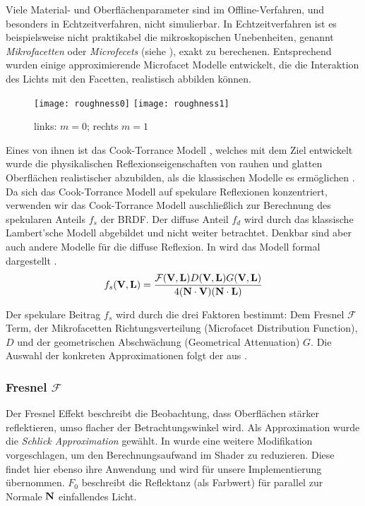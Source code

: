 Viele Material- und Oberflächenparameter sind im Offline-Verfahren, und besonders in Echtzeitverfahren, nicht simulierbar. In Echtzeitverfahren ist es beispielsweise nicht praktikabel die mikroskopischen Unebenheiten, genannt \textit{Mikrofacetten} oder \textit{Microfecets} (siehe ), exakt zu berechenen. Entsprechend wurden einige approximierende Microfacet Modelle entwickelt, die die Interaktion des Lichts mit den Facetten, realistisch abbilden können.

\begin{figure}
	\texttt{[image: roughness0]}
	\texttt{[image: roughness1]}
	\caption[Rauheit]{links: $m = 0$; rechts $m = 1$}\label{fig:microfacet}
\end{figure}

Eines von ihnen ist das Cook-Torrance Modell \parencite{Cook1981}, welches mit dem Ziel entwickelt wurde die physikalischen Reflexionseigenschaften von rauhen und glatten Oberflächen realistischer abzubilden, als die klassischen Modelle es ermöglichen \parencite[Seite 40]{Ngan2004}. Da sich das Cook-Torrance Modell auf spekulare Reflexionen konzentriert, verwenden wir das Cook-Torrance Modell auschließlich zur Berechnung des spekularen Anteils $f_s$ der BRDF. Der diffuse Anteil $f_d$ wird durch das klassische Lambert'sche Modell abgebildet und nicht weiter betrachtet. Denkbar sind aber auch andere Modelle für die diffuse Reflexion. In  wird das Modell formal dargestellt
.
\begin{align}
	\label{eq:cook-torrance-model}
	f_s(\mathbf V,\mathbf L) = \frac{\mathcal{F}(\mathbf V,\mathbf L)D(\mathbf V,\mathbf L)G(\mathbf V,\mathbf L)}{4(\mathbf N \cdot \mathbf V)(\mathbf N \cdot \mathbf L)}
\end{align}

Der spekulare Beitrag $f_s$ wird durch die drei Faktoren bestimmt: Dem Fresnel $\mathcal{F}$ Term, der Mikrofacetten Richtungsverteilung (Microfacet Distribution Function), $D$ und der geometrischen Abschwächung (Geometrical Attenuation) $G$. Die Auswahl der konkreten Approximationen folgt der aus \cite[Seite 3]{Karis2013}.

\subsubsection[Fresnel]{Fresnel $\mathcal{F}$}
Der Fresnel Effekt beschreibt die Beobachtung, dass Oberflächen stärker reflektieren, umso flacher der Betrachtungswinkel wird. Als Approximation wurde die \textit{Schlick Approximation} \parencite{Schlick1994} gewählt. In \cite{Lagarde2012} wurde eine weitere Modifikation vorgeschlagen, um den Berechnungsaufwand im Shader zu reduzieren. Diese findet hier ebenso ihre Anwendung und wird für unsere Implementierung übernommen. $F_0$ beschreibt die Reflektanz (als Farbwert) für parallel zur Normale $\mathbf N$ einfallendes Licht.

